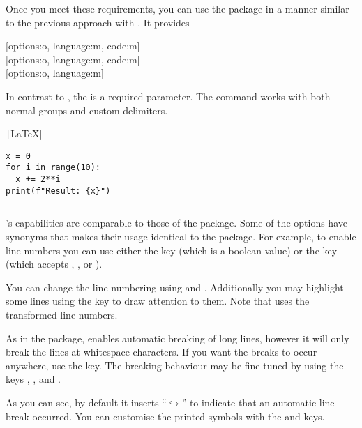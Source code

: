 Once you meet these requirements, you can use the package in a manner similar to
the previous approach with . It provides
\begin{lscommand}
  [options:o, language:m, code:m] \\
  [options:o, language:m, code:m] \\
  [options:o, language:m]
\end{lscommand}
In contrast to , the  is a required parameter.
The command  works with both normal groups and custom
delimiters.
\begin{example}[examplewidth=0.56\linewidth]
\texttt|\LaTeX{}|

\begin{verbatim}
x = 0
for i in range(10):
  x += 2**i
print(f"Result: {x}")
\end{verbatim}

\inputminted{rust}{age.rs}
\end{example}

's capabilities are comparable to those of the 
package. Some of the options have synonyms that makes their usage identical to
the  package. For example, to enable line numbers you can use
either the  key (which is a boolean value) or the 
key (which accepts , ,  or ).
You can change the line numbering using  and
. Additionally you may highlight some lines using the
 key to draw attention to them. Note that
 uses the transformed line numbers.
\begin{chktexignore}
\end{chktexignore}

As in the  package,  enables automatic
breaking of long lines, however it will only break the lines at whitespace
characters. If you want the breaks to occur anywhere, use the
 key. The breaking behaviour may be
fine-tuned by using the keys , ,
 and .
As you can see, by default it inserts \enquote{\(\hookrightarrow\)} to indicate
that an automatic line break occurred. You can customise the printed symbols
with the  and  keys.


